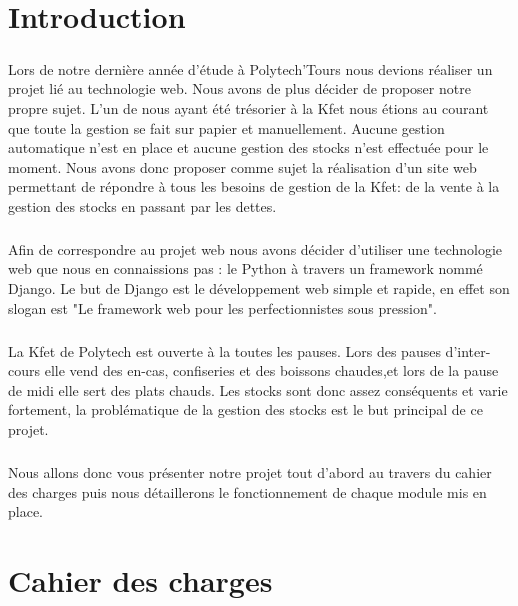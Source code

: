 \documentclass[twoside,UTF8]{EPURapport}
\begin{document}
\chapter{Introduction}

    \paragraph{}Lors de notre dernière année d'étude à Polytech'Tours nous devions réaliser un projet lié au technologie web. Nous avons de plus décider de proposer notre propre sujet. L'un de nous ayant été trésorier à la Kfet nous étions au courant que toute la gestion se fait sur papier et manuellement. Aucune gestion automatique n'est en place et aucune gestion des stocks n'est effectuée pour le moment. Nous avons donc proposer comme sujet la réalisation d'un site web permettant de répondre à tous les besoins de gestion de la Kfet: de la vente à la gestion des stocks en passant par les dettes.

    \paragraph{}Afin de correspondre au projet web nous avons décider d'utiliser une technologie web que nous en connaissions pas : le Python à travers un framework nommé Django. Le but de Django est le développement web simple et rapide, en effet son slogan est "Le framework web pour les perfectionnistes sous pression".

    \paragraph{}La Kfet de Polytech est ouverte à la toutes les pauses. Lors des pauses d'inter-cours elle vend des en-cas, confiseries et des boissons chaudes,et lors de la pause de midi elle sert des plats chauds. Les stocks sont donc assez conséquents et varie fortement, la problématique de la gestion des stocks est le but principal de ce projet.

    \paragraph{}Nous allons donc vous présenter notre projet tout d'abord au travers du cahier des charges puis nous détaillerons le fonctionnement de chaque module mis en place.

\chapter{Cahier des charges}
\end{document}
